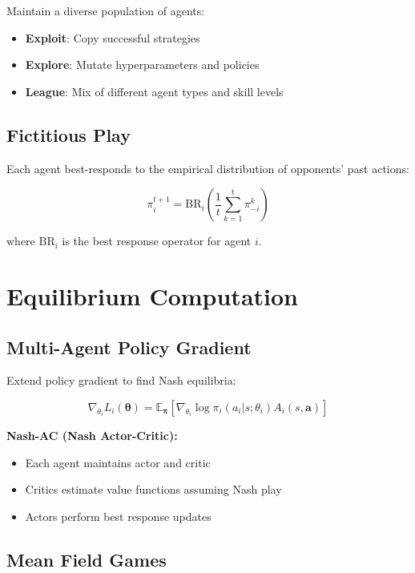 Maintain a diverse population of agents:

\begin{itemize}
    \item \textbf{Exploit}: Copy successful strategies
    \item \textbf{Explore}: Mutate hyperparameters and policies
    \item \textbf{League}: Mix of different agent types and skill levels
\end{itemize}

\subsection{Fictitious Play}

Each agent best-responds to the empirical distribution of opponents' past actions:

\begin{equation}
\pi_i^{t+1} = \text{BR}_i \left( \frac{1}{t} \sum_{k=1}^t \pi_{-i}^k \right)
\end{equation}

where $\text{BR}_i$ is the best response operator for agent $i$.

\section{Equilibrium Computation}

\subsection{Multi-Agent Policy Gradient}

Extend policy gradient to find Nash equilibria:

\begin{equation}
\nabla_{\theta_i} L_i(\boldsymbol{\theta}) = \mathbb{E}_{\boldsymbol{\pi}} \left[ \nabla_{\theta_i} \log \pi_i(a_i|s; \theta_i) A_i(s, \mathbf{a}) \right]
\end{equation}

\textbf{Nash-AC (Nash Actor-Critic):}
\begin{itemize}
    \item Each agent maintains actor and critic
    \item Critics estimate value functions assuming Nash play
    \item Actors perform best response updates
\end{itemize}

\subsection{Mean Field Games}


